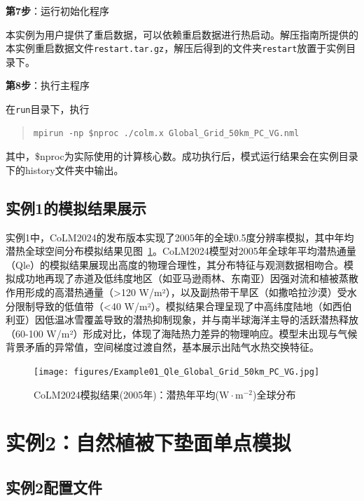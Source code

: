 \bigskip
\textbf{第7步}：运行初始化程序

本实例为用户提供了重启数据，可以依赖重启数据进行热启动。解压指南所提供的本实例重启数据文件\texttt{restart.tar.gz}，解压后得到的文件夹\texttt{restart}放置于实例目录下。

\bigskip
\textbf{第8步}：执行主程序

在\texttt{run}目录下，执行
\begin{quote}
\begin{lstlisting}
mpirun -np $nproc ./colm.x Global_Grid_50km_PC_VG.nml
\end{lstlisting}
\end{quote}

其中，\$nproc为实际使用的计算核心数。成功执行后，模式运行结果会在实例目录下的history文件夹中输出。


\subsection{实例1的模拟结果展示}

实例1中，CoLM2024的发布版本实现了2005年的全球0.5度分辨率模拟，其中年均潜热全球空间分布模拟结果见图~\ref{fig:fig_example01_qle}。CoLM2024模型对2005年全球年平均潜热通量（Qle）的模拟结果展现出高度的物理合理性，其分布特征与观测数据相吻合。模拟成功地再现了赤道及低纬度地区（如亚马逊雨林、东南亚）因强对流和植被蒸散作用形成的高潜热通量（>120 W/m²），以及副热带干旱区（如撒哈拉沙漠）受水分限制导致的低值带（<40 W/m²）。模拟结果合理呈现了中高纬度陆地（如西伯利亚）因低温冰雪覆盖导致的潜热抑制现象，并与南半球海洋主导的活跃潜热释放（60-100 W/m²）形成对比，体现了海陆热力差异的物理响应。模型未出现与气候背景矛盾的异常值，空间梯度过渡自然，基本展示出陆气水热交换特征。

\begin{figure}[htpb]
    \centering
    \texttt{[image: figures/Example01\_Qle\_Global\_Grid\_50km\_PC\_VG.jpg]}
    \caption{CoLM2024模拟结果(2005年)：潜热年平均($\mathrm{W \cdot m^{-2}}$)全球分布}
    \label{fig:fig_example01_qle}
\end{figure}

\section{实例2：自然植被下垫面单点模拟}

\subsection{实例2配置文件}\label{ex2config}

